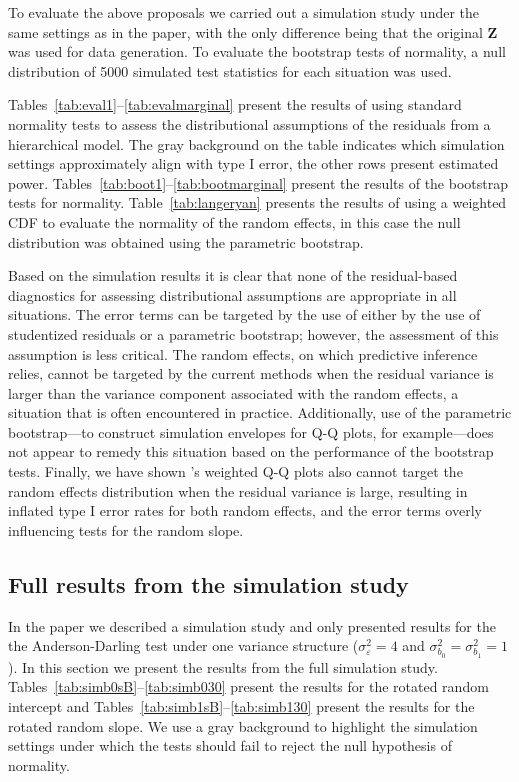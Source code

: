 \documentclass[12pt]{article} %
\begin{document}
To evaluate the above proposals we carried out a simulation study under the same settings as in the paper, with the only difference being that the original $\bm{Z}$ was used for data generation. To evaluate the bootstrap tests of normality, a null distribution of 5000 simulated test statistics for each situation was used.

Tables~\ref{tab:eval1}--\ref{tab:evalmarginal} present the results of using standard normality tests to assess the distributional assumptions of the residuals from a hierarchical model. The gray background on the table indicates which simulation settings approximately align with type I error, the other rows present estimated power. Tables~\ref{tab:boot1}--\ref{tab:bootmarginal} present the results of the bootstrap tests for normality. Table~\ref{tab:langeryan} presents the results of using a weighted CDF to evaluate the normality of the random effects, in this case the null distribution was obtained using the parametric bootstrap.

Based on the simulation results it is clear that none of the residual-based diagnostics for assessing distributional assumptions are appropriate in all situations. The error terms can be targeted by the use of either by the use of studentized residuals or a parametric bootstrap; however, the assessment of this assumption is less critical. The random effects, on which predictive inference relies, cannot be targeted by the current methods when the residual variance is larger than the variance component associated with the random effects, a situation that is often encountered in practice. Additionally, use of the parametric bootstrap---to construct simulation envelopes for Q-Q plots, for example---does not appear to remedy this situation based on the performance of the bootstrap tests. Finally, we have shown \citeauthor{Lange:1989uu}'s weighted Q-Q plots also cannot target the random effects distribution when the residual variance is large, resulting in inflated type I error rates for both random effects, and the error terms overly influencing tests for the random slope.





\subsection{Full results from the simulation study}\label{supp:simstudy}

In the paper we described a simulation study and only presented results for the the Anderson-Darling test under one variance structure ($\sigma^2_\varepsilon = 4$ and $\sigma^2_{b_0} = \sigma^2_{b_1} = 1$). In this section we present the results from the full simulation study. Tables~\ref{tab:simb0sB}--\ref{tab:simb030} present the results for the rotated random intercept and Tables~\ref{tab:simb1sB}--\ref{tab:simb130} present the results for the rotated random slope. We use a gray background to highlight the simulation settings under which the tests should fail to reject the null hypothesis of normality.



\end{document}
